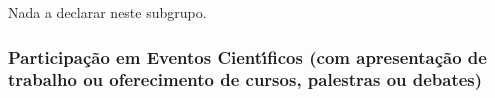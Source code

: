 \documentclass[a4paper,oneside,10pt]{article}
\begin{document}
Nada a declarar neste subgrupo.
%
%
%
%


\subsubsection{Participa\c{c}\~{a}o em Eventos Cient\'{\i}ficos (com apresenta\c{c}\~{a}o de trabalho ou oferecimento de cursos, palestras ou debates)}
\vspace{0.3cm}
\end{document}
